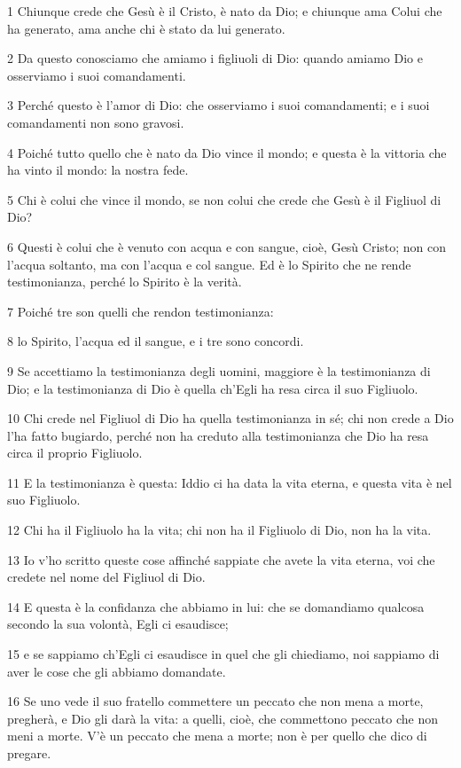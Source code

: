 \par 1 Chiunque crede che Gesù è il Cristo, è nato da Dio; e chiunque ama Colui che ha generato, ama anche chi è stato da lui generato.
\par 2 Da questo conosciamo che amiamo i figliuoli di Dio: quando amiamo Dio e osserviamo i suoi comandamenti.
\par 3 Perché questo è l'amor di Dio: che osserviamo i suoi comandamenti; e i suoi comandamenti non sono gravosi.
\par 4 Poiché tutto quello che è nato da Dio vince il mondo; e questa è la vittoria che ha vinto il mondo: la nostra fede.
\par 5 Chi è colui che vince il mondo, se non colui che crede che Gesù è il Figliuol di Dio?
\par 6 Questi è colui che è venuto con acqua e con sangue, cioè, Gesù Cristo; non con l'acqua soltanto, ma con l'acqua e col sangue. Ed è lo Spirito che ne rende testimonianza, perché lo Spirito è la verità.
\par 7 Poiché tre son quelli che rendon testimonianza:
\par 8 lo Spirito, l'acqua ed il sangue, e i tre sono concordi.
\par 9 Se accettiamo la testimonianza degli uomini, maggiore è la testimonianza di Dio; e la testimonianza di Dio è quella ch'Egli ha resa circa il suo Figliuolo.
\par 10 Chi crede nel Figliuol di Dio ha quella testimonianza in sé; chi non crede a Dio l'ha fatto bugiardo, perché non ha creduto alla testimonianza che Dio ha resa circa il proprio Figliuolo.
\par 11 E la testimonianza è questa: Iddio ci ha data la vita eterna, e questa vita è nel suo Figliuolo.
\par 12 Chi ha il Figliuolo ha la vita; chi non ha il Figliuolo di Dio, non ha la vita.
\par 13 Io v'ho scritto queste cose affinché sappiate che avete la vita eterna, voi che credete nel nome del Figliuol di Dio.
\par 14 E questa è la confidanza che abbiamo in lui: che se domandiamo qualcosa secondo la sua volontà, Egli ci esaudisce;
\par 15 e se sappiamo ch'Egli ci esaudisce in quel che gli chiediamo, noi sappiamo di aver le cose che gli abbiamo domandate.
\par 16 Se uno vede il suo fratello commettere un peccato che non mena a morte, pregherà, e Dio gli darà la vita: a quelli, cioè, che commettono peccato che non meni a morte. V'è un peccato che mena a morte; non è per quello che dico di pregare.
